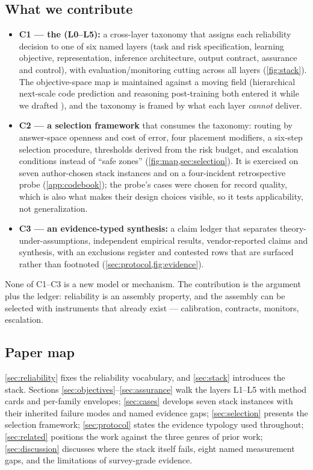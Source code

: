 \subsection{What we contribute}
\begin{itemize}[leftmargin=1.8em, itemsep=1pt]
\item \textbf{C1 --- the \reliabilitystack{} (L0--L5):} a cross-layer taxonomy that assigns each
reliability decision to one of six named layers (task and risk specification, learning objective,
representation, inference architecture, output contract, assurance and control), with
evaluation/monitoring cutting across all layers (\cref{fig:stack}). The objective-space map is
maintained against a moving field (hierarchical next-scale code prediction and reasoning
post-training both entered it while we drafted \cite{kumbong2026ncm}), and the taxonomy is
framed by what each layer \emph{cannot} deliver.
\item \textbf{C2 --- a selection framework} that consumes the taxonomy: routing by answer-space
openness and cost of error, four placement modifiers, a six-step selection procedure,
thresholds derived from the risk budget, and escalation conditions instead of ``safe zones''
(\cref{fig:map,sec:selection}). It is exercised on seven author-chosen stack instances and on a
four-incident retrospective probe (\cref{app:codebook}); the probe's cases were chosen for
record quality, which is also what makes their design choices visible, so it tests
applicability, not generalization.
\item \textbf{C3 --- an evidence-typed synthesis:} a claim ledger that separates theory-under-assumptions,
independent empirical results, vendor-reported claims and synthesis, with an exclusions register
and contested rows that are surfaced rather than footnoted (\cref{sec:protocol,fig:evidence}).
\end{itemize}
None of C1--C3 is a new model or mechanism. The contribution is the argument plus the ledger:
reliability is an assembly property, and the assembly can be selected with instruments that
already exist --- calibration, contracts, monitors, escalation.

\subsection{Paper map}
\cref{sec:reliability} fixes the reliability vocabulary, and \cref{sec:stack} introduces the stack.
Sections \ref{sec:objectives}--\ref{sec:assurance} walk the layers L1--L5 with method cards and
per-family envelopes; \cref{sec:cases} develops seven stack instances with their inherited failure
modes and named evidence gaps; \cref{sec:selection} presents the selection framework;
\cref{sec:protocol} states the evidence typology used throughout; \cref{sec:related} positions
the work against the three genres of prior work; \cref{sec:discussion} discusses where the stack
itself fails, eight named measurement gaps, and the limitations of survey-grade evidence.
